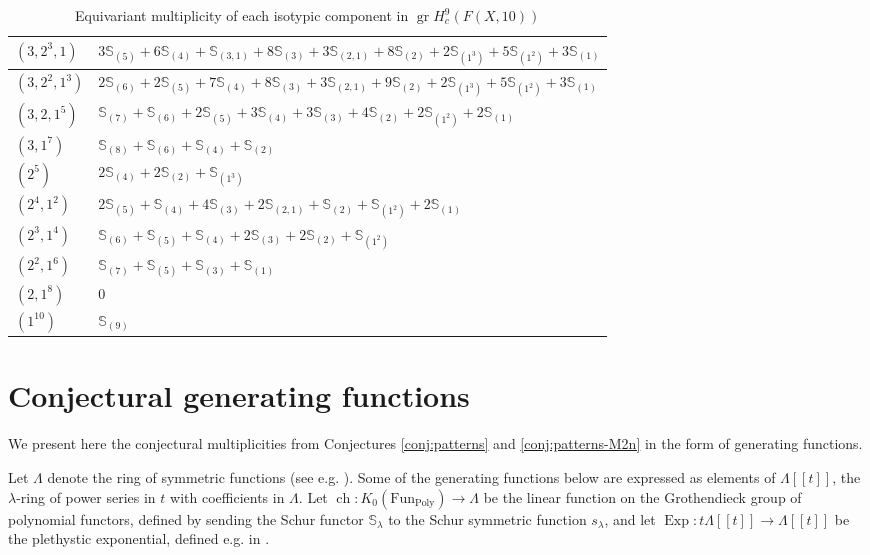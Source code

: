 \documentclass[12pt]{article}
\newcommand{\Schur}[1]{\mathbb{S}_{#1}}
\DeclareMathOperator{\gr}{gr}
\theoremstyle{plain}
\theoremstyle{definition}
\theoremstyle{remark}
\begin{document}
\begin{table}[h]
\begin{tabular}{|m{1.7cm}|m{15cm}|}
\hline
$(3,2^3,1)$ & $3\Schur{(5)} + 6\Schur{(4)} + \Schur{(3,1)} + 8\Schur{(3)} + 3\Schur{(2,1)} + 8\Schur{(2)} + 2\Schur{(1^3)} + 5\Schur{(1^2)} + 3\Schur{(1)}$ \\
\hline
$(3,2^2,1^3)$ & $2\Schur{(6)} + 2\Schur{(5)} + 7\Schur{(4)} + 8\Schur{(3)} + 3\Schur{(2,1)} + 9\Schur{(2)} + 2\Schur{(1^3)} + 5\Schur{(1^2)} + 3\Schur{(1)}$ \\
\hline
$(3,2,1^5)$ & $\Schur{(7)} + \Schur{(6)} + 2\Schur{(5)} + 3\Schur{(4)} + 3\Schur{(3)} + 4\Schur{(2)} + 2\Schur{(1^2)} + 2\Schur{(1)}$ \\
\hline
$(3,1^7)$ & $\Schur{(8)} + \Schur{(6)} + \Schur{(4)} + \Schur{(2)}$ \\
\hline
$(2^5)$ & $2\Schur{(4)} + 2\Schur{(2)} + \Schur{(1^3)}$ \\
\hline
$(2^4,1^2)$ & $2\Schur{(5)} + \Schur{(4)} + 4\Schur{(3)} + 2\Schur{(2,1)} + \Schur{(2)} + \Schur{(1^2)} + 2\Schur{(1)}$ \\
\hline
$(2^3,1^4)$ & $\Schur{(6)} + \Schur{(5)} + \Schur{(4)} + 2\Schur{(3)} + 2\Schur{(2)} + \Schur{(1^2)}$ \\
\hline
$(2^2,1^6)$ & $\Schur{(7)} + \Schur{(5)} + \Schur{(3)} + \Schur{(1)}$ \\
\hline
$(2,1^8)$ & 0 \\
\hline
$(1^{10})$ & $\Schur{(9)}$ \\
\hline
    \end{tabular}
    \caption{Equivariant multiplicity of each isotypic component in $\gr H_c^{9}(F(X,10))$}
    \label{table:final_answer10}
\end{table}

\section{Conjectural generating functions}\label{app:generating-functions}
We present here the conjectural multiplicities from Conjectures \ref{conj:patterns} and \ref{conj:patterns-M2n} in the form of generating functions.

Let $\Lambda$ denote the ring of symmetric functions (see e.g. \cite{MacDonald}). Some of the generating functions below are expressed as elements of $\Lambda[[t]]$, the $\lambda$-ring of power series in $t$ with coefficients in $\Lambda$. Let $\operatorname{ch}: K_0(\operatorname{Fun_{Poly}})\to \Lambda$ be the linear function on the Grothendieck group of polynomial functors, defined by sending the Schur functor $\Schur{\lambda}$ to the Schur symmetric function $s_{\lambda}$, and let $\operatorname{Exp}\colon t\Lambda[[t]]\to \Lambda[[t]]$ be the plethystic exponential, defined e.g. in \cite{GK-modular-operad}.
\end{document}
